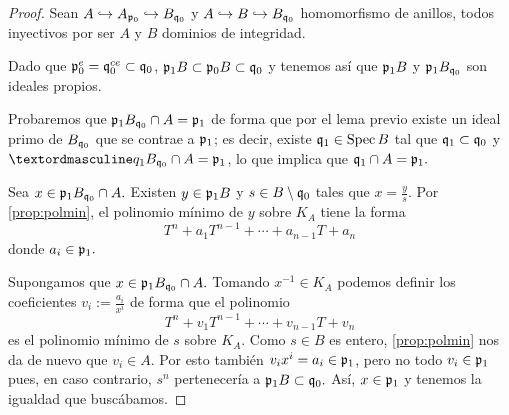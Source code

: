 \documentclass[../main.tex]{subfiles}
\begin{document}
	\begin{proof}
		Sean $A\hookrightarrow A_{\mathfrak{p}_0}\hookrightarrow B_{\mathfrak{q}_0}$ y $A\hookrightarrow B\hookrightarrow B_{\mathfrak{q}_0}$ homomorfismo de anillos, todos inyectivos por ser $A$ y $B$ dominios de integridad.
		
		Dado que $\mathfrak{p}_0^e=\mathfrak{q}_0^{ce}\subset\mathfrak{q}_0$, $\mathfrak{p}_1B\subset\mathfrak{p}_0B\subset\mathfrak{q}_0$ y tenemos así que $\mathfrak{p}_1B$ y $\mathfrak{p}_1B_{\mathfrak{q}_0}$ son ideales propios.
		
		Probaremos que $\mathfrak{p}_1 B_{\mathfrak{q}_0}\cap A=\mathfrak{p}_1$ de forma que por el lema previo existe un ideal primo de $B_{\mathfrak{q}_0}$ que se contrae a $\mathfrak{p}_1$; es decir, existe $\mathfrak{q}_1\in\operatorname{Spec} B$ tal que $\mathfrak{q}_1\subset\mathfrak{q}_0$ y $ºq_1B_{\q_0}\cap A=\p_1$, lo que implica que $\mathfrak{q}_1\cap A=\mathfrak{p}_1.$
		
		Sea $x\in \mathfrak{p}_1 B_{\mathfrak{q}_0}\cap A.$ Existen $y\in\mathfrak{p}_1 B$ y $s\in B\setminus\mathfrak{q}_0$ tales que $x=\frac{y}{s}.$ Por \ref{prop:polmin}, el polinomio mínimo de $y$ sobre $K_A$ tiene la forma
		$$T^n+a_1T^{n-1}+\cdots+a_{n-1}T+a_n$$
		donde $a_i\in\mathfrak{p}_1.$
		
		Supongamos que $x\in\mathfrak{p}_1 B_{\mathfrak{q}_0}\cap A.$ Tomando $x^{-1}\in K_A$ podemos definir los coeficientes $v_i:=\frac{a_i}{x^i}$ de forma que el polinomio
		$$T^n+v_1T^{n-1}+\cdots+v_{n-1}T+v_n$$
		es el polinomio mínimo de $s$ sobre $K_A.$ Como $s\in B$ es entero, \ref{prop:polmin} nos da de nuevo que $v_i\in A.$ Por esto también $v_i x^i=a_i\in\mathfrak{p}_1$, pero no todo $v_i\in\mathfrak{p}_1$ pues, en caso contrario, $s^n$ pertenecería a $\mathfrak{p}_1B\subset \mathfrak{q}_0.$ Así, $x\in\mathfrak{p}_1$ y tenemos la igualdad que buscábamos.
	\end{proof}
\end{document}
